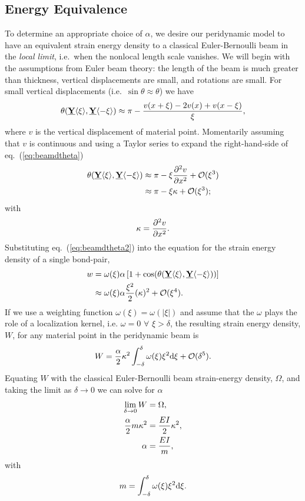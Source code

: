 \documentclass[preprint,review,12pt]{elsarticle}
\newcommand\vstate[3]{%
	\mathbf{\underline{#1}}%
	\ifstrempty{#2}{}{[#2]}%
	\ifstrempty{#3}{}{\langle #3 \rangle}}
\begin{document}
\subsection{Energy Equivalence}
\label{sec:EnergyEq}
%
To determine an appropriate choice of $\alpha$, we desire our peridynamic model to have an equivalent strain energy density to a classical Euler-Bernoulli beam in the \emph{local limit}, i.e.\ when the nonlocal length scale vanishes.  We will begin with the assumptions from Euler beam theory: the length of the beam is much greater than thickness, vertical displacements are small, and rotations are small. For small vertical displacements (i.e.\ $\sin{\theta} \approx \theta$) we have
%
\begin{equation}
\theta(\vstate{Y}{}{\xi},\vstate{Y}{}{\mathbf{-\xi}}) \approx \pi-\frac{v(x+\xi)-2v(x)+v(x-\xi)}{\xi},
\label{eq:beamdtheta}
\end{equation}
%
where $v$ is the vertical displacement of material point.  Momentarily assuming that $v$ is continuous and using a Taylor series to expand the right-hand-side of eq.~(\ref{eq:beamdtheta})  
%
\begin{align}
\theta(\vstate{Y}{}{\xi},\vstate{Y}{}{\mathbf{-\xi}}) &\approx \pi-\xi \frac{\partial^2 v}{\partial x^2}+\mathcal{O}(\xi^3) \notag \\
&\approx  \pi-\xi \kappa +\mathcal{O}(\xi^3); 
\label{eq:beamdtheta2}
\end{align}
with
\begin{equation}
\kappa = \frac{\partial^2 v}{\partial x^2}.\notag
\end{equation}
%
Substituting eq.~(\ref{eq:beamdtheta2}) into the equation for the strain energy density of a single bond-pair,
%
\begin{align}
\label{eq:continuousBeamw}
w &= \omega(\xi) \alpha \left[1+\cos(\theta(\vstate{Y}{}{\xi},\vstate{Y}{}{\mathbf{-\xi}})) \right] \notag\\
&\approx \omega(\xi) \alpha\frac{\xi^2}{2}(\kappa)^2 +\mathcal{O}(\xi^4).\notag
\end{align}
%
If we use a weighting function \(\omega(\xi)=\omega(|\xi|)\) and assume that the $\omega$ plays the role of a localization kernel, i.e. $\omega = 0 \,\, \forall \,\, \xi > \delta$, the resulting strain energy density, $W$, for any material point in the peridynamic beam is
%
\begin{equation}
W = \frac{\alpha}{2}\kappa^2 \int_{-\delta}^\delta \omega(\xi)\xi^2 {\rm d}\xi + \mathcal{O}(\delta^5).\notag
\end{equation}
%
Equating $W$ with the classical Euler-Bernoulli beam strain-energy density, $\Omega$, and taking the limit as $\delta \to 0$ we can solve for $\alpha$
%
\begin{align}
    \lim_{\delta \to 0}  W &= \Omega, \notag \\
    \frac{\alpha}{2} m \kappa^2 &= \frac{EI}{2} \kappa^2, \notag \\
    \alpha &= \frac{EI}{m},
\label{eq:alpha}
\end{align}
%
with 
\begin{equation}
    m = \int_{-\delta}^{\delta} \omega(\xi) \xi^2 {\rm d}\xi \notag.
\end{equation}
\end{document}
